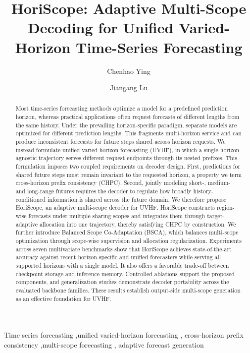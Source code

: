 \documentclass[final,3p,times]{elsarticle}
\begin{document}
\hypersetup{pageanchor=false}
\begin{frontmatter}

\title{HoriScope: Adaptive Multi-Scope Decoding for Unified Varied-Horizon Time-Series Forecasting}

\author{Chenhao Ying}
\author{Jiangang Lu}
\address{State Key Laboratory of Industrial Control Technology, College of
Control Science and Engineering, Zhejiang University, Hangzhou 310027,
Zhejiang, China}

\begin{abstract}
Most time-series forecasting methods optimize a model for a predefined prediction horizon, whereas practical applications often request forecasts of different lengths from the same history. Under the prevailing horizon-specific paradigm, separate models are optimized for different prediction lengths. This fragments multi-horizon service and can produce inconsistent forecasts for future steps shared across horizon requests. We instead formulate unified varied-horizon forecasting (UVHF), in which a single horizon-agnostic trajectory serves different request endpoints through its nested prefixes. This formulation imposes two coupled requirements on decoder design. First, predictions for shared future steps must remain invariant to the requested horizon, a property we term cross-horizon prefix consistency (CHPC). Second, jointly modeling short-, medium- and long-range futures requires the decoder to regulate how broadly history-conditioned information is shared across the future domain. We therefore propose HoriScope, an adaptive multi-scope decoder for UVHF. HoriScope constructs region-wise forecasts under multiple sharing scopes and integrates them through target-adaptive allocation into one trajectory, thereby satisfying CHPC by construction. We further introduce Balanced Scope Co-Adaptation (BSCA), which balances multi-scope optimization through scope-wise supervision and allocation regularization. Experiments across seven multivariate benchmarks show that HoriScope achieves state-of-the-art accuracy against recent horizon-specific and unified forecasters while serving all supported horizons with a single model. It also offers a favorable trade-off between checkpoint storage and inference memory. Controlled ablations support the proposed components, and generalization studies demonstrate decoder portability across the evaluated backbone families. These results establish output-side multi-scope generation as an effective foundation for UVHF.
\end{abstract}



\begin{keyword}
Time series forecasting \sep unified varied-horizon forecasting \sep
cross-horizon prefix consistency \sep multi-scope forecasting \sep
adaptive forecast generation
\end{keyword}

\end{frontmatter}
\hypersetup{pageanchor=true}
\end{document}
